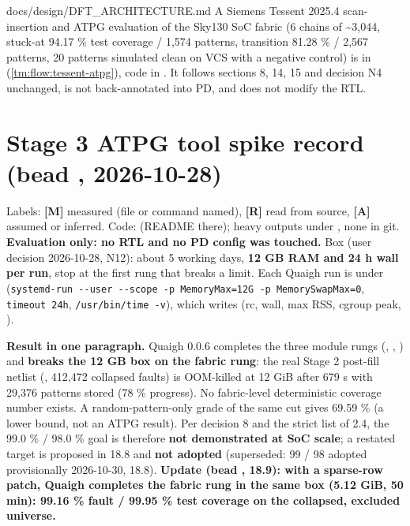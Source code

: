 \begin{relocated}{docs/design/DFT_ARCHITECTURE.md}
A Siemens Tessent 2025.4 scan-insertion and ATPG evaluation of the
Sky130 SoC fabric (6 chains of \textasciitilde3,044, stuck-at 94.17 \%
test coverage / 1,574 patterns, transition 81.28 \% / 2,567 patterns, 20
patterns simulated clean on VCS with a negative control) is in
 (\cref{tm:flow:tessent-atpg}), code in .
It follows sections 8, 14, 15 and decision N4 unchanged, is not
back-annotated into PD, and does not modify the RTL.

\section{\texorpdfstring{Stage 3 ATPG tool spike record (bead
,
2026-10-28)}{Stage 3 ATPG tool spike record (bead , 2026-10-28)}}\label{tm:ch:dft-architecture:18-stage-3-atpg-tool-spike-record-bead-j41m15-2026-10-28}

Labels: \textbf{{[}M{]}} measured (file or command named),
\textbf{{[}R{]}} read from source, \textbf{{[}A{]}} assumed or inferred.
Code:  (README there); heavy outputs under
, none in git.
\textbf{Evaluation only: no RTL and no PD config was touched.} Box (user
decision 2026-10-28, N12): about 5 working days, \textbf{12 GB RAM and
24 h wall per run}, stop at the first rung that breaks a limit. Each
Quaigh run is under 
(\texttt{systemd-\allowbreak{}run\ -\allowbreak{}-\allowbreak{}user\ -\allowbreak{}-\allowbreak{}scope\ -\allowbreak{}p\ MemoryMax=\allowbreak{}12G\ -\allowbreak{}p\ MemorySwapMax=\allowbreak{}0},
\texttt{timeout\ 24h},
\texttt{/\allowbreak{}usr/\allowbreak{}bin/\allowbreak{}time\ -\allowbreak{}v}),
which writes  (rc, wall, max RSS, cgroup peak,
).

\textbf{Result in one paragraph.} Quaigh 0.0.6 completes the three
module rungs (, , ) and \textbf{breaks
the 12 GB box on the fabric rung}: the real Stage 2 post-fill netlist
(, 412,472 collapsed faults) is OOM-killed
at 12 GiB after 679 s with 29,376 patterns stored (78 \% progress). No
fabric-level deterministic coverage number exists. A random-pattern-only
grade of the same cut gives 69.59 \% (a lower bound, not an ATPG
result). Per decision 8 and the strict list of 2.4, the 99.0 \% / 98.0
\% goal is therefore \textbf{not demonstrated at SoC scale}; a restated
target is proposed in 18.8 and \textbf{not adopted} (superseded: 99 / 98
adopted provisionally 2026-10-30, 18.8). \textbf{Update (bead
, 18.9): with a sparse-row patch, Quaigh completes the
fabric rung in the same box (5.12 GiB, 50 min): 99.16 \% fault / 99.95
\% test coverage on the collapsed, excluded universe.}


\end{relocated}
